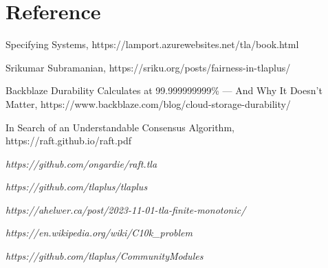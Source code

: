 \chapter{Reference}

\begin{thebibliography}{9}

Specifying Systems, 
https://lamport.azurewebsites.net/tla/book.html

\bibitem{}
Srikumar Subramanian,
https://sriku.org/posts/fairness-in-tlaplus/


Backblaze Durability Calculates at 99.999999999\% — And Why It Doesn’t Matter,
https://www.backblaze.com/blog/cloud-storage-durability/

In Search of an Understandable Consensus Algorithm,
https://raft.github.io/raft.pdf

\textit{https://github.com/ongardie/raft.tla}

\textit{https://github.com/tlaplus/tlaplus}

\textit{https://ahelwer.ca/post/2023-11-01-tla-finite-monotonic/}

\textit{https://en.wikipedia.org/wiki/C10k\_problem}

\textit{https://github.com/tlaplus/CommunityModules}

\end{thebibliography}

